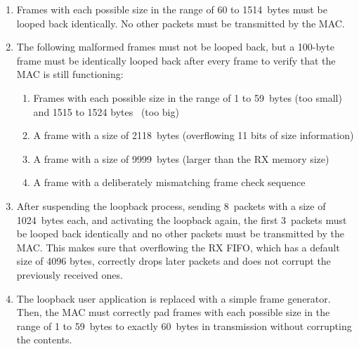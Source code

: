 \documentclass[a4paper, 11pt, oneside]{Thesis}  %
\begin{document}
\begin{enumerate}
\item\label{item:test_frames_ok} Frames with each possible size in the range of 60 to 1514~bytes must be looped back identically. No other packets must be transmitted by the MAC.
\item\label{item:test_frames_corrupt} The following malformed frames must not be looped back, but a 100-byte frame must be identically looped back after every frame to verify that the MAC is still functioning:
\begin{enumerate}
\item Frames with each possible size in the range of 1 to 59~bytes (too small) and 1515 to 1524 bytes~ (too big)
\item A frame with a size of 2118~bytes (overflowing 11 bits of size information)
\item A frame with a size of 9999~bytes (larger than the RX memory size) 
\item A frame with a deliberately mismatching frame check sequence
\end{enumerate}
\item\label{item:test_rx_fifo_of} After suspending the loopback process, sending 8~packets with a size of 1024~bytes each, and activating the loopback again, the first 3~packets must be looped back identically and no other packets must be transmitted by the MAC. This makes sure that overflowing the RX FIFO, which has a default size of 4096 bytes, correctly drops later packets and does not corrupt the previously received ones.
\item\label{item:test_pad} The loopback user application is replaced with a simple frame generator. Then, the MAC must correctly pad frames with each possible size in the range of 1 to 59~bytes to exactly 60~bytes in transmission without corrupting the contents.
\end{enumerate}
\end{document}
